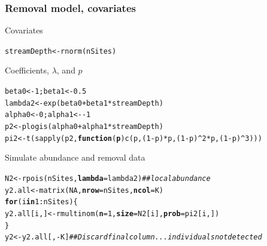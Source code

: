 \documentclass[color=usenames,dvipsnames]{beamer}\usepackage[]{graphicx}\usepackage[]{xcolor}
\makeatletter
\newcommand{\hlnum}[1]{\textcolor[rgb]{0.69,0.494,0}{#1}}%
\newcommand{\hlcom}[1]{\textcolor[rgb]{0.514,0.506,0.514}{\textit{#1}}}%
\newcommand{\hlopt}[1]{\textcolor[rgb]{0,0,0}{#1}}%
\newcommand{\hlstd}[1]{\textcolor[rgb]{0,0,0}{#1}}%
\newcommand{\hlkwa}[1]{\textcolor[rgb]{0,0,0}{\textbf{#1}}}%
\newcommand{\hlkwb}[1]{\textcolor[rgb]{0,0.341,0.682}{#1}}%
\newcommand{\hlkwc}[1]{\textcolor[rgb]{0,0,0}{\textbf{#1}}}%
\newcommand{\hlkwd}[1]{\textcolor[rgb]{0.004,0.004,0.506}{#1}}%
\newenvironment{kframe}{%
 \def\at@end@of@kframe{}%
 \ifinner\ifhmode%
  \def\at@end@of@kframe{\end{minipage}}%
  \begin{minipage}{\columnwidth}%
 \fi\fi%
 \def\FrameCommand##1{\hskip\@totalleftmargin \hskip-\fboxsep
 \colorbox{shadecolor}{##1}\hskip-\fboxsep
     \hskip-\linewidth \hskip-\@totalleftmargin \hskip\columnwidth}%
 \MakeFramed {\advance\hsize-\width
   \@totalleftmargin\z@ \linewidth\hsize
   \@setminipage}}%
 {\par\unskip\endMakeFramed%
 \at@end@of@kframe}
\newenvironment{knitrout}{}{} %
\makeatother
\begin{document}
\begin{frame}[fragile]
  \frametitle{Removal model, covariates}
  \small
  Covariates
  \vspace{-6pt}
\begin{knitrout}\scriptsize
{}\color{fgcolor}\begin{kframe}
\begin{alltt}
\hlstd{streamDepth} \hlkwb{<-} \hlkwd{rnorm}\hlstd{(nSites)}
\end{alltt}
\end{kframe}
\end{knitrout}
\vfill
  Coefficients, $\lambda$, and $p$
  \vspace{-6pt}
\begin{knitrout}\scriptsize
{}\color{fgcolor}\begin{kframe}
\begin{alltt}
\hlstd{beta0} \hlkwb{<-} \hlnum{1}\hlstd{; beta1} \hlkwb{<-} \hlnum{0.5}
\hlstd{lambda2} \hlkwb{<-} \hlkwd{exp}\hlstd{(beta0} \hlopt{+} \hlstd{beta1}\hlopt{*}\hlstd{streamDepth)}
\hlstd{alpha0} \hlkwb{<-} \hlnum{0}\hlstd{; alpha1} \hlkwb{<-} \hlopt{-}\hlnum{1}
\hlstd{p2} \hlkwb{<-} \hlkwd{plogis}\hlstd{(alpha0} \hlopt{+} \hlstd{alpha1}\hlopt{*}\hlstd{streamDepth)}
\hlstd{pi2} \hlkwb{<-} \hlkwd{t}\hlstd{(}\hlkwd{sapply}\hlstd{(p2,} \hlkwa{function}\hlstd{(}\hlkwc{p}\hlstd{)} \hlkwd{c}\hlstd{(p, (}\hlnum{1}\hlopt{-}\hlstd{p)}\hlopt{*}\hlstd{p, (}\hlnum{1}\hlopt{-}\hlstd{p)}\hlopt{^}\hlnum{2}\hlopt{*}\hlstd{p, (}\hlnum{1}\hlopt{-}\hlstd{p)}\hlopt{^}\hlnum{3}\hlstd{)))}
\end{alltt}
\end{kframe}
\end{knitrout}
\vfill
  Simulate abundance and removal data
  \vspace{-6pt}
\begin{knitrout}\scriptsize
{}\color{fgcolor}\begin{kframe}
\begin{alltt}
\hlstd{N2} \hlkwb{<-} \hlkwd{rpois}\hlstd{(nSites,} \hlkwc{lambda}\hlstd{=lambda2)}         \hlcom{## local abundance }
\hlstd{y2.all} \hlkwb{<-} \hlkwd{matrix}\hlstd{(}\hlnum{NA}\hlstd{,} \hlkwc{nrow}\hlstd{=nSites,} \hlkwc{ncol}\hlstd{=K)}
\hlkwa{for}\hlstd{(i} \hlkwa{in} \hlnum{1}\hlopt{:}\hlstd{nSites) \{}
    \hlstd{y2.all[i,]} \hlkwb{<-} \hlkwd{rmultinom}\hlstd{(}\hlkwc{n}\hlstd{=}\hlnum{1}\hlstd{,} \hlkwc{size}\hlstd{=N2[i],} \hlkwc{prob}\hlstd{=pi2[i,])}
\hlstd{\}}
\hlstd{y2} \hlkwb{<-} \hlstd{y2.all[,}\hlopt{-}\hlstd{K]} \hlcom{## Discard final column... individuals not detected}
\end{alltt}
\end{kframe}
\end{knitrout}
\end{frame}
\end{document}

